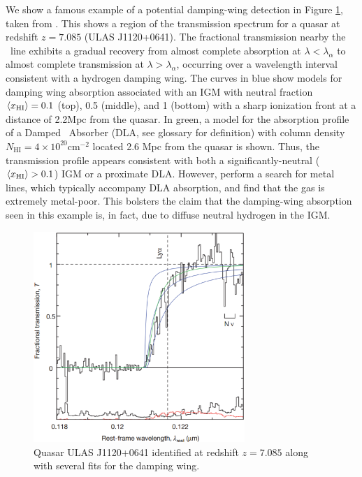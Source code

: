 We show a famous example of a potential damping-wing detection in Figure \ref{fig:Mortlock}, taken from \citet{Mortlock2011}. This shows a region of the transmission spectrum for a quasar at redshift $z = 7.085$ (ULAS J1120+0641). The fractional transmission nearby the \lya\ line exhibits a gradual recovery from almost complete absorption at $\lambda < \lambda_{\alpha}$ to almost complete transmission at $\lambda > \lambda_{\alpha}$, occurring over a wavelength interval consistent with a hydrogen damping wing. The curves in blue show models for damping wing absorption associated with an IGM with neutral fraction $\langle x_{\text{HI}}\rangle = 0.1$ (top), 0.5 (middle), and 1 (bottom) with a sharp ionization front at a distance of 2.2Mpc from the quasar. In green, a model for the absorption profile of a Damped \lya\ Absorber (DLA, see glossary for definition) with column density $N_{\text{HI}} = 4\times10^{20}\text{cm}^{-2}$ located 2.6 Mpc from the quasar is shown. Thus, the transmission profile appears consistent with both a significantly-neutral ($\langle x_{\text{HI}}\rangle > 0.1$) IGM or a proximate DLA. However, \citet{Simcoe} perform a search for metal lines, which typically accompany DLA absorption, and find that the gas is extremely metal-poor. This bolsters the claim that the damping-wing absorption seen in this example is, in fact, due to diffuse neutral hydrogen in the IGM. 


\begin{figure}[!p]
  \centering
  \includegraphics[width=8cm]{z7p085_DampingWing.eps}
  \caption{Quasar ULAS J1120+0641 identified at redshift $z = 7.085$ along with several fits for the damping wing.}
  \label{fig:Mortlock}
\end{figure}


